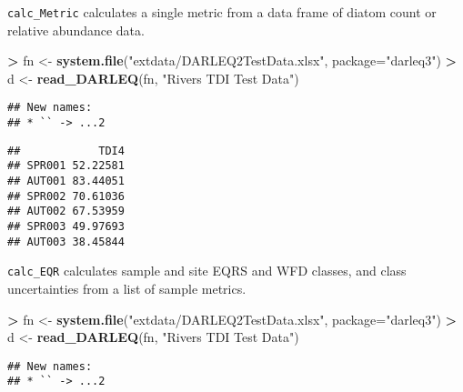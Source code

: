 \documentclass[
]{article}
\newenvironment{Shaded}{\begin{snugshade}}{\end{snugshade}}
\newcommand{\DataTypeTok}[1]{\textcolor[rgb]{0.13,0.29,0.53}{#1}}
\newcommand{\KeywordTok}[1]{\textcolor[rgb]{0.13,0.29,0.53}{\textbf{#1}}}
\newcommand{\NormalTok}[1]{#1}
\newcommand{\OperatorTok}[1]{\textcolor[rgb]{0.81,0.36,0.00}{\textbf{#1}}}
\newcommand{\StringTok}[1]{\textcolor[rgb]{0.31,0.60,0.02}{#1}}
\begin{document}
\texttt{calc\_Metric} calculates a single metric from a data frame of
diatom count or relative abundance data.

\begin{Shaded}
\begin{Highlighting}[]
\OperatorTok{>}\StringTok{ }\NormalTok{fn <-}\StringTok{ }\KeywordTok{system.file}\NormalTok{(}\StringTok{"extdata/DARLEQ2TestData.xlsx"}\NormalTok{, }\DataTypeTok{package=}\StringTok{"darleq3"}\NormalTok{)}
\OperatorTok{>}\StringTok{ }\NormalTok{d <-}\StringTok{ }\KeywordTok{read_DARLEQ}\NormalTok{(fn, }\StringTok{"Rivers TDI Test Data"}\NormalTok{)}
\end{Highlighting}
\end{Shaded}

\begin{verbatim}
## New names:
## * `` -> ...2
\end{verbatim}

\begin{Shaded}
\end{Shaded}

\begin{verbatim}
##            TDI4
## SPR001 52.22581
## AUT001 83.44051
## SPR002 70.61036
## AUT002 67.53959
## SPR003 49.97693
## AUT003 38.45844
\end{verbatim}

\texttt{calc\_EQR} calculates sample and site EQRS and WFD classes, and
class uncertainties from a list of sample metrics.

\begin{Shaded}
\begin{Highlighting}[]
\OperatorTok{>}\StringTok{ }\NormalTok{fn <-}\StringTok{ }\KeywordTok{system.file}\NormalTok{(}\StringTok{"extdata/DARLEQ2TestData.xlsx"}\NormalTok{, }\DataTypeTok{package=}\StringTok{"darleq3"}\NormalTok{)}
\OperatorTok{>}\StringTok{ }\NormalTok{d <-}\StringTok{ }\KeywordTok{read_DARLEQ}\NormalTok{(fn, }\StringTok{"Rivers TDI Test Data"}\NormalTok{)}
\end{Highlighting}
\end{Shaded}

\begin{verbatim}
## New names:
## * `` -> ...2
\end{verbatim}
\end{document}
